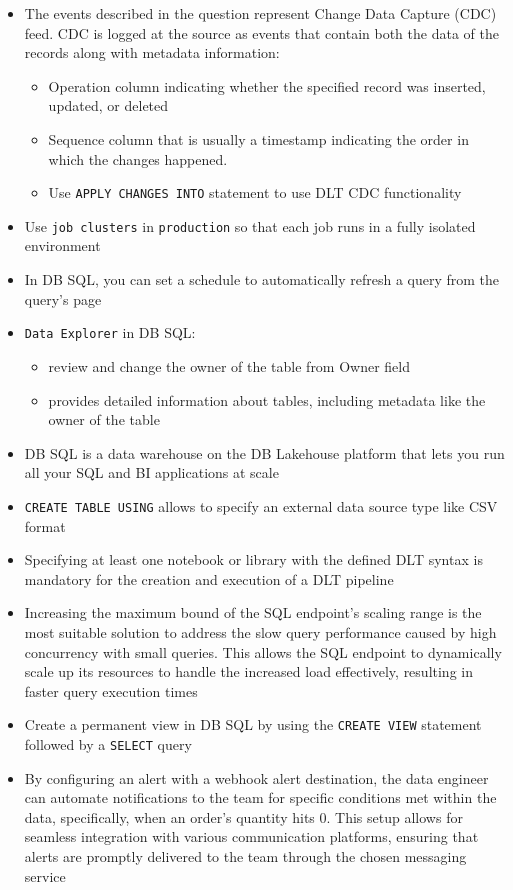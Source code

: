 \documentclass[11pt]{scrartcl}
\begin{document}
\begin{itemize}
	\item The events described in the question represent Change Data Capture (CDC) feed. CDC is logged at the source as events that contain both the data of the records along with metadata information:
	\begin{itemize}
		\item Operation column indicating whether the specified record was inserted, updated, or deleted
		\item Sequence column that is usually a timestamp indicating the order in which the changes happened. 
		\item Use \texttt{APPLY CHANGES INTO} statement to use DLT CDC functionality
	\end{itemize}
	\item Use \texttt{job clusters} in \texttt{production} so that each job runs in a fully isolated environment
	\item In DB SQL, you can set a schedule to automatically refresh a query from the query's page
	\item \texttt{Data Explorer} in DB SQL:
	\begin{itemize}
		\item review and change the owner of the table from Owner field
		\item provides detailed information about tables, including metadata like the owner of the table
	\end{itemize}
	\item DB SQL is a data warehouse on the DB Lakehouse platform that lets you run all your SQL and BI applications at scale
	\item \texttt{CREATE TABLE USING} allows to specify an external data source type like CSV format
	\item Specifying at least one notebook or library with the defined DLT syntax is mandatory for the creation and execution of a DLT pipeline
	\item Increasing the maximum bound of the SQL endpoint's scaling range is the most suitable solution to address the slow query performance caused by high concurrency with small queries. This allows the SQL endpoint to dynamically scale up its resources to handle the increased load effectively, resulting in faster query execution times
	\item Create a permanent view in DB SQL by using the \texttt{CREATE VIEW} statement followed by a \texttt{SELECT} query
	\item By configuring an alert with a webhook alert destination, the data engineer can automate notifications to the team for specific conditions met within the data, specifically, when an order's quantity hits 0. This setup allows for seamless integration with various communication platforms, ensuring that alerts are promptly delivered to the team through the chosen messaging service

\end{itemize}
\end{document}
